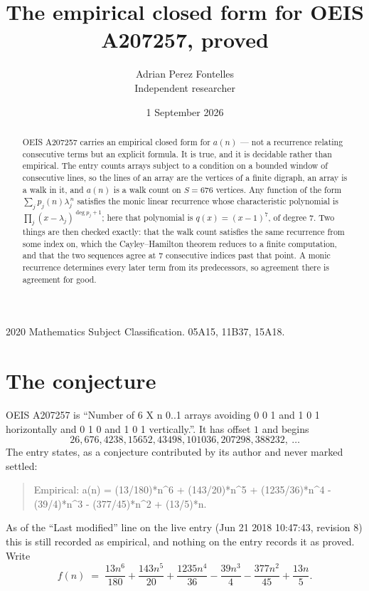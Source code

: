 \documentclass[11pt,a4paper]{article}
\title{The empirical closed form for OEIS A207257, proved}
\author{Adrian Perez Fontelles\\ \small Independent researcher}
\date{1 September 2026}
\theoremstyle{plain}
\theoremstyle{definition}
\begin{document}
\maketitle

\begin{abstract}
OEIS A207257 carries an empirical closed form for $a(n)$ --- not a recurrence relating
consecutive terms but an explicit formula. It is true, and it is decidable rather than
empirical. The entry counts arrays subject to a condition on a bounded window of consecutive lines, so the lines of an array are the
vertices of a finite digraph, an array is a walk in it, and $a(n)$ is a walk count on
$S=676$ vertices. Any function of the form $\sum_j p_j(n)\lambda_j^{\,n}$ satisfies the
monic linear recurrence whose characteristic polynomial is
$\prod_j(x-\lambda_j)^{\deg p_j+1}$; here that polynomial is $q(x)=(x-1)^{7}$, of degree
$7$. Two things are then checked exactly: that the walk count satisfies the same
recurrence from some index on, which the Cayley--Hamilton theorem reduces to a finite
computation, and that the two sequences agree at $7$ consecutive indices past that
point. A monic recurrence determines every later term from its predecessors, so agreement
there is agreement for good.
\end{abstract}

\noindent\small 2020 Mathematics Subject Classification. 05A15, 11B37, 15A18.\normalsize

\section{The conjecture}

OEIS A207257 is ``Number of 6 X n 0..1 arrays avoiding 0 0 1 and 1 0 1 horizontally and 0 1 0 and 1 0 1 vertically.''. It has offset $1$ and begins
\[
26, 676, 4238, 15652, 43498, 101036, 207298, 388232,\ \dots
\]
The entry states, as a conjecture contributed by its author and never marked settled:
\begin{quote}
Empirical: a(n) = (13/180)*n\^{}6 + (143/20)*n\^{}5 + (1235/36)*n\^{}4 - (39/4)*n\^{}3 - (377/45)*n\^{}2 + (13/5)*n.
\end{quote}
As of the ``Last modified'' line on the live entry (Jun 21 2018 10:47:43, revision 8) this is still
recorded as empirical, and nothing on the entry records it as proved. Write
\[
f(n)\;=\;\frac{13 n^{6}}{180} + \frac{143 n^{5}}{20} + \frac{1235 n^{4}}{36} - \frac{39 n^{3}}{4} - \frac{377 n^{2}}{45} + \frac{13 n}{5}.
\]
\end{document}
